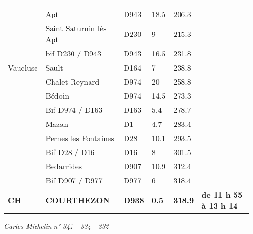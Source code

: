 \documentclass{article}%
\begin{document}
\begin{longtable}{p{2.25cm}|p{7.0cm}|p{1.5cm}|p{1.5cm}|p{1.5cm}|p{3.5cm}}
\hline& & & & & \\%
 &Apt&D943&18.5&206.3& \\%
 &Saint Saturnin lès Apt&D230&9&215.3& \\%
 &bif D230 / D943&D943&16.5&231.8& \\%
Vaucluse   &Sault&D164&7&238.8& \\%
 &Chalet Reynard&D974&20&258.8& \\%
 &Bédoin&D974&14.5&273.3& \\%
 &Bif D974 / D163&D163&5.4&278.7& \\%
 &Mazan&D1&4.7&283.4& \\%
 &Pernes les Fontaines&D28&10.1&293.5& \\%
 &Bif D28 / D16&D16&8&301.5& \\%
 &Bedarrides&D907&10.9&312.4& \\%
 &Bif D907 / D977&D977&6&318.4& \\%
\textbf{CH}&\textbf{COURTHEZON}&\textbf{D938}&\textbf{0.5}&\textbf{318.9}&\textbf{de 11 h 55 à 13 h 14}\\%
\hline%
\end{longtable}%
\begin{flushleft} \textit{Cartes Michelin n° 341 - 334 - 332
} \end{flushleft}%
\end{document}
